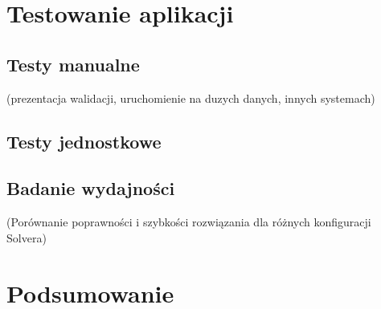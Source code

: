\documentclass[12pt,a4paper]{report}
\begin{document}
	\chapter{Testowanie aplikacji}
	\section{Testy manualne}
	(prezentacja walidacji, uruchomienie na duzych danych, innych systemach)
	\section{Testy jednostkowe}
	\section{Badanie wydajności}
	(Porównanie poprawności i szybkości rozwiązania dla różnych konfiguracji Solvera)
	
	\chapter*{Podsumowanie}
	
	
	
\end{document}
